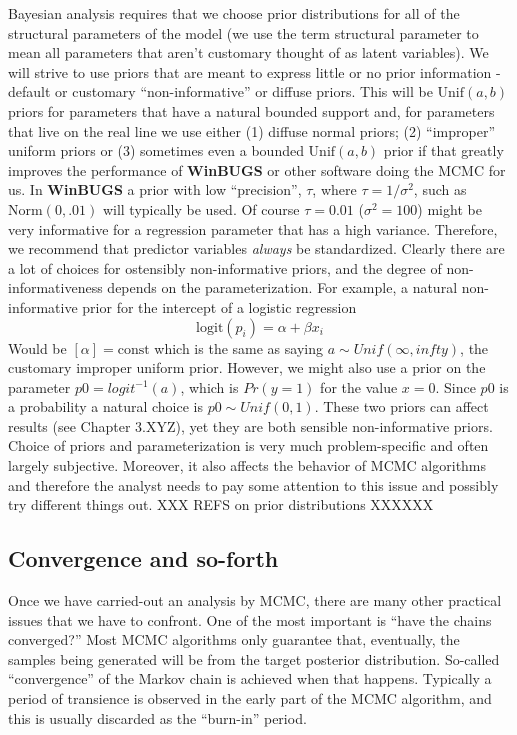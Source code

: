 Bayesian analysis requires that we choose prior
distributions for all of the structural parameters of the model (we
use the term structural parameter to mean all parameters that aren't
customary thought of as latent variables). We will strive to use
priors that are meant to express little or no prior information -
default or customary ``non-informative'' or diffuse priors. This will
be $\mbox{Unif}(a,b)$ priors for parameters that have a natural
bounded support and, for parameters that live on the real line we use
either (1) diffuse normal priors; (2) ``improper'' uniform priors or
(3) sometimes even a bounded $\mbox{Unif}(a,b)$ prior if that greatly
improves the performance of {\bf WinBUGS} or other software doing the MCMC
for us.  In {\bf WinBUGS} a prior with low ``precision'', $\tau$, where
$\tau = 1/\sigma^2$, such as $\mbox{Norm}(0,.01)$ will typically be
used. Of course $\tau = 0.01$ ($\sigma^{2} = 100$) might be very
informative for a regression parameter that has a high
variance. Therefore, we recommend that predictor variables {\it
  always} be standardized. Clearly there are a lot of choices for
ostensibly non-informative priors, and the degree of
non-informativeness depends on the parameterization. For example, a
natural non-informative prior for the intercept of a logistic
regression
\[
\mbox{logit}(p_{i}) = \alpha + \beta x_{i}
\]
Would be $[\alpha] = \mbox{const}$ which is the same as saying $a \sim
Unif(\infty,infty)$, the customary improper uniform prior.
However, we might also use a prior on the parameter $p0
= logit^{-1}(a)$, which is $Pr(y=1)$ for the value $x=0$. Since $p0$ is a
probability a natural choice is $p0 \sim Unif(0,1)$. These two priors can
affect results (see Chapter 3.XYZ), yet they are both sensible
non-informative priors. Choice of priors and parameterization is
very much problem-specific and often largely subjective. Moreover, it
also affects the behavior of MCMC algorithms and therefore the analyst
needs to pay some attention to this issue and possibly try different
things out. 
XXX REFS on prior distributions XXXXXX

\subsection{Convergence and so-forth}

Once we have carried-out an analysis by MCMC, there are many other
practical issues that we have to confront.  One of the most important
is ``have the chains converged?'' Most MCMC algorithms only guarantee
that, eventually, the samples being generated will be from the target
posterior distribution. So-called ``convergence'' of the Markov chain
is achieved when that happens.  Typically a period of transience is
observed in the early part of the MCMC algorithm, and this is usually
discarded as the ``burn-in'' period.

